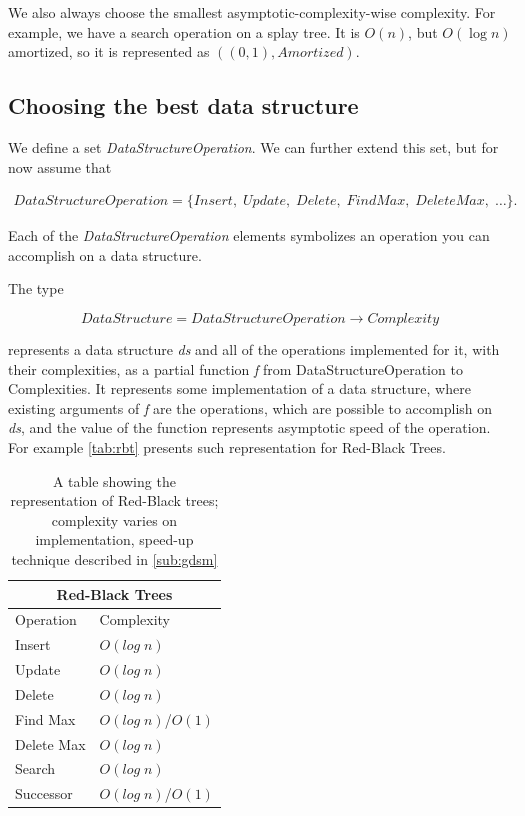 \documentclass[a4paper,11pt]{article}
\begin{document}
		We also always choose the smallest asymptotic-complexity-wise complexity.  For example, we have a search
		operation on a splay tree. It is $O(n)$, but $O(\log n)$ amortized, so it is represented as
		$((0,1),Amortized)$.

	\subsection{Choosing the best data structure} \label{sec:choose-ds}

		We define a set \emph{DataStructureOperation}. We can further extend this set, but for now assume that

		\begin{eqnarray}
			\mathit{DataStructureOperation} = \{Insert, \; Update, \; Delete, \; FindMax,\; DeleteMax, \; \dots\}.
		\end{eqnarray}

		Each of the \emph{DataStructureOperation} elements symbolizes an operation you can accomplish on a data
		structure.

		The type

		\begin{equation}\label{data-structure-type}
			DataStructure = DataStructureOperation \rightarrow Complexity
		\end{equation}

		represents a data structure \emph{ds} and all of the operations implemented for it, with their complexities, as a
		partial function \emph{f} from DataStructureOperation to Complexities. It represents some implementation of a
		data structure, where existing arguments of \emph{f} are the operations, which are possible to accomplish on
		\emph{ds}, and the value of the function represents asymptotic speed of the operation. For example
		\autoref{tab:rbt} presents such representation for Red-Black Trees.

		\begin{table}[h!]
			\centering
			\begin{tabular}{|l|l|}
				\hline
				\multicolumn{2}{|c|}{Red-Black Trees} \\
				\hline
				Operation & Complexity \\
				\hline
				Insert 	        & $O(log \; n)$ \\
				Update          & $O(log \; n)$ \\
				Delete	        & $O(log \; n)$ \\
				Find Max 	& $O(log \; n)$/$O(1)$\\
				Delete Max	& $O(log \; n)$ \\
				Search 		& $O(log \; n)$ \\
				Successor 	& $O(log \; n)$/$O(1)$\\
				\hline
			\end{tabular}
			\caption{A table showing the representation of Red-Black trees; complexity varies on
			implementation, speed-up technique described in \autoref{sub:gdsm}}
			\label{tab:rbt}
		\end{table}
\end{document}
